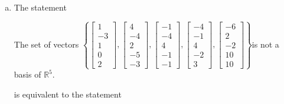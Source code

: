 \begin{exerciseAnswer}
\begin{enumerate}[(a)]
\item The statement 
\begin{center}\begin{minipage}{0.8\textwidth}
 The set of vectors \( \left\{ \left[\begin{array}{c}
1 \\
-3 \\
1 \\
0 \\
2
\end{array}\right] , \left[\begin{array}{c}
4 \\
-4 \\
2 \\
-5 \\
-3
\end{array}\right] , \left[\begin{array}{c}
-1 \\
-4 \\
4 \\
-1 \\
-1
\end{array}\right] , \left[\begin{array}{c}
-4 \\
-1 \\
4 \\
-2 \\
3
\end{array}\right] , \left[\begin{array}{c}
-6 \\
2 \\
-2 \\
10 \\
10
\end{array}\right] \right\} \)is not a basis of \(\mathbb{R}^5\). 
\end{minipage}\end{center}
     is equivalent to the statement 
\begin{center}\begin{minipage}{0.8\textwidth}
 The set of vectors \( \left\{ \left[\begin{array}{c}
1 \\
-3 \\
1 \\
0 \\
2
\end{array}\right] , \left[\begin{array}{c}
4 \\
-4 \\

\end{array}
\end{minipage}
\end{center}
\end{enumerate}
\end{exerciseAnswer}
